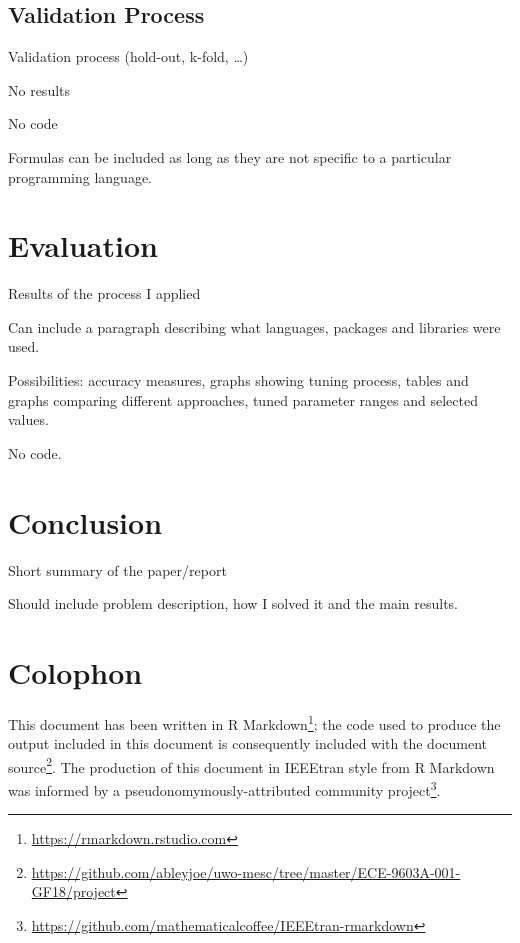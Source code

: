 \documentclass[conference]{IEEEtran}
\begin{document}
\subsection{Validation Process}\label{sec:validation-process}

Validation process (hold-out, k-fold, \ldots{})

No results

No code

Formulas can be included as long as they are not specific to a
particular programming language.

\section{Evaluation}\label{sec:evaluation}

\label{sec:evaluation}

Results of the process I applied

Can include a paragraph describing what languages, packages and
libraries were used.

Possibilities: accuracy measures, graphs showing tuning process, tables
and graphs comparing different approaches, tuned parameter ranges and
selected values.

No code.

\section{Conclusion}\label{sec:conclusion}

\label{sec:conclusion}

Short summary of the paper/report

Should include problem description, how I solved it and the main
results.

\section{Colophon}\label{sec:colophon}

This document has been written in R
Markdown\footnote{\url{https://rmarkdown.rstudio.com}}; the code used to
produce the output included in this document is consequently included
with the document
source\footnote{\url{https://github.com/ableyjoe/uwo-mesc/tree/master/ECE-9603A-001-GF18/project}}.
The production of this document in IEEEtran style from R Markdown was
informed by a pseudonomymously-attributed community
project\footnote{\url{https://github.com/mathematicalcoffee/IEEEtran-rmarkdown}}.


\end{document}
